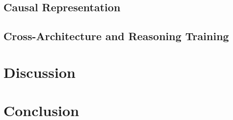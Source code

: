 \documentclass[letterpaper]{article}
\begin{document}
\subsection{Causal Representation}

\subsection{Cross-Architecture and Reasoning Training}

\section{Discussion}

\section{Conclusion}




\end{document}
